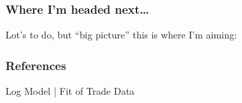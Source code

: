 \documentclass[9pt,pdftex,aspectratio=1610]{beamer}
\theoremstyle{definition}
\begin{document}

\begin{frame}[t]
\frametitle{Where I'm headed next\ldots}
\smallskip
Lot's to do, but ``big picture'' this is where I'm aiming:\\

\end{frame}



\appendix

\setcounter{finalframe}{\value{framenumber}}

\begin{frame}[allowframebreaks]
\frametitle{References}
\scriptsize

\end{frame}


\begin{frame}[t]{Log Model | Fit of Trade Data}
\begin{figure}[!t]
\end{figure}
\end{frame}
\end{document}

